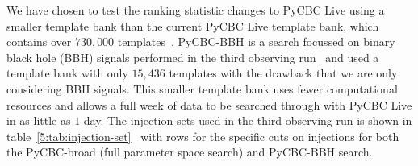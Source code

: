We have chosen to test the ranking statistic changes to PyCBC Live using a smaller template bank than the current PyCBC Live template bank, which contains over $730,000$ templates~\cite{PyCBC_Live:2018}. PyCBC-BBH is a search focussed on binary black hole (BBH) signals performed in the third observing run~\cite{gwtc3:2023, PyCBC_focussed_bbh:2024} and used a template bank with only $15,436$ templates with the drawback that we are only considering BBH signals. This smaller template bank uses fewer computational resources and allows a full week of data to be searched through with PyCBC Live in as little as $1$ day. The injection sets used in the third observing run is shown in table~\ref{5:tab:injection-set}~\cite{gwtc3:2023} with rows for the specific cuts on injections for both the PyCBC-broad (full parameter space search) and PyCBC-BBH search.
